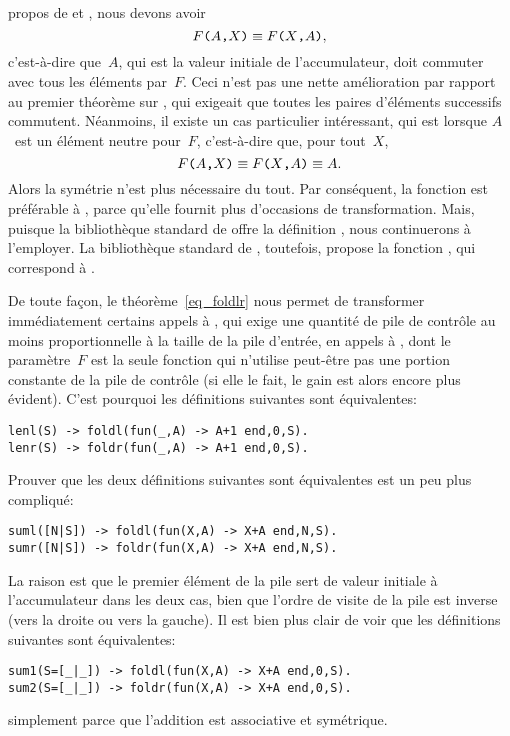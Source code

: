 propos de  et , nous devons
avoir
\begin{equation*}
\texttt{\(F\)(\(A\),\(X\))}
\equiv
\texttt{\(F\)(\(X\),\(A\))},
\end{equation*}
c'est-à-dire que~\(A\), qui est la valeur initiale de l'accumulateur,
doit commuter avec tous les éléments par~\(F\). Ceci n'est pas une
nette amélioration par rapport au premier théorème sur
, qui exigeait que toutes les paires d'éléments
successifs commutent. Néanmoins, il existe un cas particulier
intéressant, qui est lorsque \(A\)~est un élément neutre pour~\(F\),
c'est-à-dire que, pour tout~\(X\),
\begin{equation*}
\texttt{\(F\)(\(A\),\(X\))}
\equiv
\texttt{\(F\)(\(X\),\(A\))} \equiv A.
\end{equation*}
Alors la symétrie n'est plus nécessaire du tout. Par conséquent, la
fonction  est préférable à ,
parce qu'elle fournit plus d'occasions de transformation. Mais,
puisque la bibliothèque standard de \Erlang offre la définition
, nous continuerons à l'employer. La bibliothèque
standard de \OCaml, toutefois, propose la fonction
, qui correspond à .

De toute façon, le théorème~\eqref{eq_foldlr} nous permet de
transformer immédiatement certains appels à , qui
exige une quantité de pile de contrôle au moins proportionnelle à la
taille de la pile d'entrée, en appels à , dont le
paramètre~\(F\) est la seule fonction qui n'utilise peut-être pas une
portion constante de la pile de contrôle (si elle le fait, le gain est
alors encore plus évident). C'est pourquoi les définitions suivantes
sont équivalentes:
\begin{verbatim}
lenl(S) -> foldl(fun(_,A) -> A+1 end,0,S).
lenr(S) -> foldr(fun(_,A) -> A+1 end,0,S).
\end{verbatim}
Prouver que les deux définitions suivantes sont équivalentes est un
peu plus compliqué:
\begin{verbatim}
suml([N|S]) -> foldl(fun(X,A) -> X+A end,N,S).
sumr([N|S]) -> foldr(fun(X,A) -> X+A end,N,S).
\end{verbatim}
La raison est que le premier élément de la pile sert de valeur
initiale à l'accumulateur dans les deux cas, bien que l'ordre de
visite de la pile est inverse (vers la droite ou vers la gauche). Il
est bien plus clair de voir que les définitions suivantes sont
équivalentes:
\begin{verbatim}
sum1(S=[_|_]) -> foldl(fun(X,A) -> X+A end,0,S).
sum2(S=[_|_]) -> foldr(fun(X,A) -> X+A end,0,S).
\end{verbatim}
simplement parce que l'addition est associative et symétrique.

